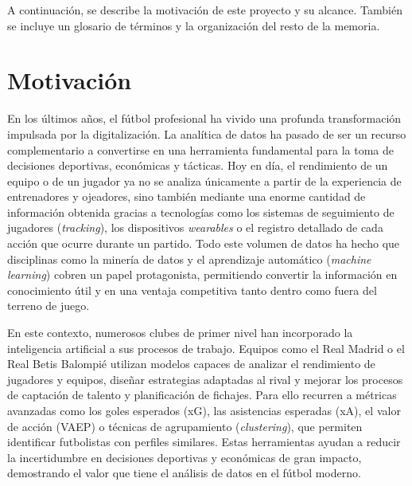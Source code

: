 
\raggedbottom
A continuación, se describe la motivación de este proyecto y su alcance. También se incluye un glosario de términos y la organización del resto de la memoria.

\section{Motivación}
En los últimos años, el fútbol profesional ha vivido una profunda transformación impulsada por la digitalización. La analítica de datos ha pasado de ser un recurso complementario a convertirse en una herramienta fundamental para la toma de decisiones deportivas, económicas y tácticas. Hoy en día, el rendimiento de un equipo o de un jugador ya no se analiza únicamente a partir de la experiencia de entrenadores y ojeadores, sino también mediante una enorme cantidad de información obtenida gracias a tecnologías como los sistemas de seguimiento de jugadores (\textit{tracking}), los dispositivos \textit{wearables} o el registro detallado de cada acción que ocurre durante un partido. Todo este volumen de datos ha hecho que disciplinas como la minería de datos y el aprendizaje automático (\textit{machine learning}) cobren un papel protagonista, permitiendo convertir la información en conocimiento útil y en una ventaja competitiva tanto dentro como fuera del terreno de juego.

En este contexto, numerosos clubes de primer nivel han incorporado la inteligencia artificial a sus procesos de trabajo. Equipos como el Real Madrid o el Real Betis Balompié utilizan modelos capaces de analizar el rendimiento de jugadores y equipos, diseñar estrategias adaptadas al rival y mejorar los procesos de captación de talento y planificación de fichajes. Para ello recurren a métricas avanzadas como los goles esperados (xG), las asistencias esperadas (xA), el valor de acción (VAEP) o técnicas de agrupamiento (\textit{clustering}), que permiten identificar futbolistas con perfiles similares. Estas herramientas ayudan a reducir la incertidumbre en decisiones deportivas y económicas de gran impacto, demostrando el valor que tiene el análisis de datos en el fútbol moderno.

